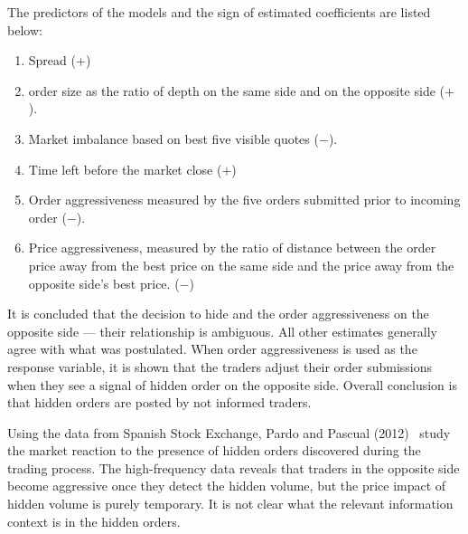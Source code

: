The predictors of the models and the sign of estimated coefficients are listed below:
        \begin{enumerate}[--]
        \item Spread ($+$)
        \item order size as the ratio of depth on the same side and on the opposite side ($+$).
        \item Market imbalance based on best five visible quotes ($-$).
        \item Time left before the market close ($+$)
        \item Order aggressiveness measured by the five orders submitted prior to incoming order ($-$).
        \item Price aggressiveness, measured by the ratio of distance between the order price away from the best price on the same side and the price away from the opposite side's best price. ($-$)
        \end{enumerate}

It is concluded that the decision to hide and the order aggressiveness on the opposite side --- their relationship is ambiguous. All other estimates generally agree with what was postulated. When order aggressiveness is used as the response variable, it is shown that the traders adjust their order submissions when they see a signal of hidden order on the opposite side. Overall conclusion is that hidden orders are posted by not informed traders. 


Using the data from Spanish Stock Exchange, Pardo and Pascual (2012)~\cite{pardopas} study the market reaction to the presence of hidden orders discovered during the trading process. The high-frequency data reveals that traders in the opposite side become aggressive once they detect the hidden volume, but the price impact of hidden volume is purely temporary. It is not clear what the relevant information context is in the hidden orders.


